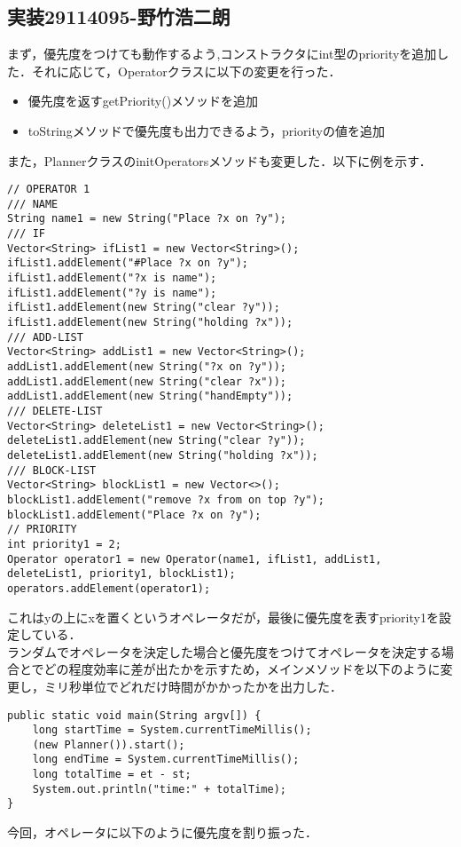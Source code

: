 \documentclass{jarticle}
\begin{document}
\subsection{実装29114095-野竹浩二朗}
まず，優先度をつけても動作するよう,コンストラクタにint型のpriorityを追加した．それに応じて，Operatorクラスに以下の変更を行った．
\begin{itemize}
\item 優先度を返すgetPriority()メソッドを追加
\item toStringメソッドで優先度も出力できるよう，priorityの値を追加
\end{itemize}
また，PlannerクラスのinitOperatorsメソッドも変更した．以下に例を示す．
\begin{lstlisting}
// OPERATOR 1
/// NAME
String name1 = new String("Place ?x on ?y");
/// IF
Vector<String> ifList1 = new Vector<String>();
ifList1.addElement("#Place ?x on ?y");
ifList1.addElement("?x is name");
ifList1.addElement("?y is name");
ifList1.addElement(new String("clear ?y"));
ifList1.addElement(new String("holding ?x"));
/// ADD-LIST
Vector<String> addList1 = new Vector<String>();
addList1.addElement(new String("?x on ?y"));
addList1.addElement(new String("clear ?x"));
addList1.addElement(new String("handEmpty"));
/// DELETE-LIST
Vector<String> deleteList1 = new Vector<String>();
deleteList1.addElement(new String("clear ?y"));
deleteList1.addElement(new String("holding ?x"));
/// BLOCK-LIST
Vector<String> blockList1 = new Vector<>();
blockList1.addElement("remove ?x from on top ?y");
blockList1.addElement("Place ?x on ?y");
// PRIORITY
int priority1 = 2;
Operator operator1 = new Operator(name1, ifList1, addList1, deleteList1, priority1, blockList1);
operators.addElement(operator1);
\end{lstlisting}
これはyの上にxを置くというオペレータだが，最後に優先度を表すpriority1を設定している．\\
ランダムでオペレータを決定した場合と優先度をつけてオペレータを決定する場合とでどの程度効率に差が出たかを示すため，メインメソッドを以下のように変更し，ミリ秒単位でどれだけ時間がかかったかを出力した．\\
\begin{lstlisting}
public static void main(String argv[]) {
	long startTime = System.currentTimeMillis();
	(new Planner()).start();
	long endTime = System.currentTimeMillis();
	long totalTime = et - st;
	System.out.println("time:" + totalTime);
}
\end{lstlisting}
今回，オペレータに以下のように優先度を割り振った．\\
\end{document}
